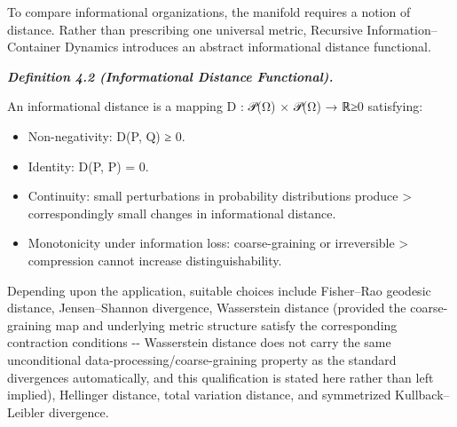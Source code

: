 \documentclass[
]{article}
\begin{document}
To compare informational organizations, the manifold requires a notion
of distance. Rather than prescribing one universal metric, Recursive
Information--Container Dynamics introduces an abstract informational
distance functional.

\emph{\textbf{Definition 4.2 (Informational Distance Functional).}}

An informational distance is a mapping D : 𝒫(Ω) × 𝒫(Ω) → ℝ≥0 satisfying:

\begin{itemize}
\item
  Non-negativity: D(P, Q) ≥ 0.
\item
  Identity: D(P, P) = 0.
\item
  Continuity: small perturbations in probability distributions produce
  \textgreater{} correspondingly small changes in informational
  distance.
\item
  Monotonicity under information loss: coarse-graining or irreversible
  \textgreater{} compression cannot increase distinguishability.
\end{itemize}

Depending upon the application, suitable choices include Fisher--Rao
geodesic distance, Jensen--Shannon divergence, Wasserstein distance
(provided the coarse-graining map and underlying metric structure
satisfy the corresponding contraction conditions -\/- Wasserstein
distance does not carry the same unconditional
data-processing/coarse-graining property as the standard divergences
automatically, and this qualification is stated here rather than left
implied), Hellinger distance, total variation distance, and symmetrized
Kullback--Leibler divergence.
\end{document}
